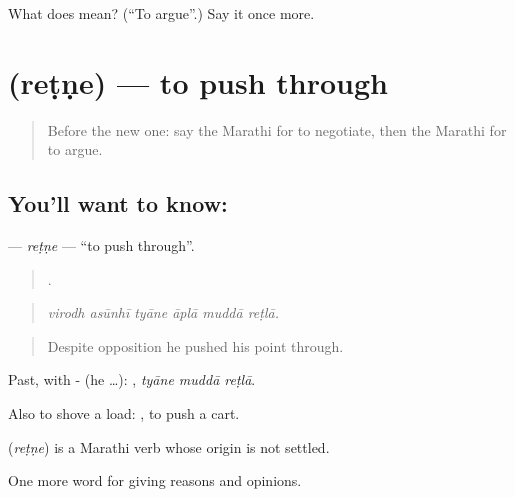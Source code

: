 \begin{tcolorbox}[breakable,colback=teal!4,colframe=teal!35!black,title={Before you move on}]
What does   mean? (\textquotedblleft{}To argue\textquotedblright{}.) Say it once more.
\end{tcolorbox}
\section[\texorpdfstring{\mr{रेटणे} (reṭṇe)}{रेटणे (reṭṇe)}]{ (reṭṇe) — to push through}

\label{lesson:MR-C365-retne}



\begin{quote}
Before the new one: say the Marathi for to negotiate, then the Marathi for to argue.
\end{quote}

\subsection*{You'll want to know: }
\textbf{} — \emph{reṭṇe} — \textquotedblleft{}to push through\textquotedblright{}.

\begin{quote}
     .
\end{quote}

\begin{quote}
\emph{virodh asūnhī tyāne āplā muddā reṭlā.}
\end{quote}

\begin{quote}
Despite opposition he pushed his point through.
\end{quote}

Past, with - (he …):   , \emph{tyāne muddā reṭlā}.

Also to shove a load:  , to push a cart.

\begin{cousinweb}
\textbf{} (\emph{reṭṇe}) is a Marathi verb whose origin is not settled.
\end{cousinweb}

\begin{grammarlens}[title={What you've built}]
One more word for giving reasons and opinions.
\end{grammarlens}

